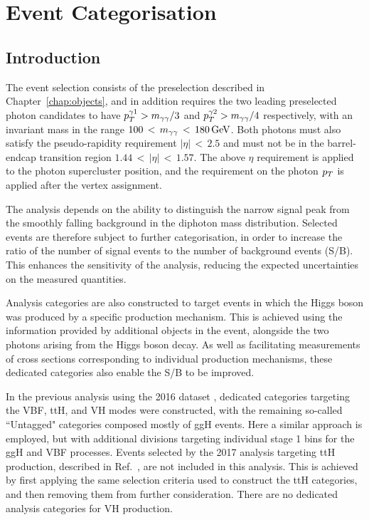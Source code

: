 \chapter{Event Categorisation}
\label{chap:categorisation}

\section{Introduction}

The event selection consists of the preselection described in Chapter~\ref{chap:objects}, 
and in addition requires the two leading preselected photon candidates to have 
$p_T^{\gamma 1} > m_{\gamma\gamma}/3$ and $p_T^{\gamma 2} > m_{\gamma\gamma} /4$ respectively, 
with an invariant mass in the range $100\,<\,m_{\gamma\gamma}\,<\,\SI{180}{GeV}$.
Both photons must also satisfy the
pseudo-rapidity requirement $|\eta|\,<\,2.5$ and must not be in the barrel-endcap
transition region $1.44\,<\,|\eta|\,<\,1.57$.
The above $\eta$ requirement is applied to the photon supercluster
position, and the requirement on the photon $p_T$ is applied 
after the vertex assignment.

The \Hgg analysis depends on the ability to distinguish the narrow signal peak 
from the smoothly falling background in the diphoton mass distribution.
Selected events are therefore subject to further categorisation, in order to 
increase the ratio of the number of signal events to the number of background events (S/B).
This enhances the sensitivity of the analysis, 
reducing the expected uncertainties on the measured quantities.

Analysis categories are also constructed to target events in which the Higgs boson was 
produced by a specific production mechanism. 
This is achieved using the information provided by additional objects in the event, 
alongside the two photons arising from the Higgs boson decay.
As well as facilitating measurements of cross sections corresponding 
to individual production mechanisms, these dedicated categories also enable the S/B to be improved.

In the previous \Hgg analysis using the 2016 dataset \cite{HIG-16-040}, 
dedicated categories targeting the VBF, ttH, and VH modes were constructed, 
with the remaining so-called ``Untagged" categories composed mostly of ggH events.
Here a similar approach is employed, 
but with additional divisions targeting individual stage 1 bins for the ggH and VBF processes.
Events selected by the 2017 \Hgg analysis targeting ttH production, 
described in Ref.~\cite{HIG-18-018}, are not included in this analysis. 
This is achieved by first applying the same selection criteria used to construct the ttH categories, 
and then removing them from further consideration. 
There are no dedicated analysis categories for VH production.

